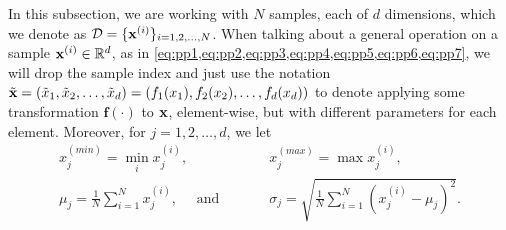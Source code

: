 \documentclass{statsmsc}
\begin{document}
{In this subsection, we are working with $N$ samples, each of $d$ dimensions, which we
denote as $\mathcal{D}=\{\mathbf{x}^{(i)} \}_{i=1,2,\dots,N}$. When talking about a general operation
on a sample $\mathbf{x}^{(i)}\in\mathbb{R}^d$, as in \cref{eq:pp1,eq:pp2,eq:pp3,eq:pp4,eq:pp5,eq:pp6,eq:pp7},
we will drop the sample index and just use the notation
$\tilde{\mathbf{x}}=\left(\tilde{x}_1,\tilde{x}_2,\dots,\tilde{x}_d \right)
=(f_1(x_1), f_2(x_2),\dots,f_d(x_d))$ to denote applying some transformation $\mathbf{f}(\cdot)$ to
$\mathbf{x}$, element-wise, but with different parameters for each element.
Moreover, for $j=1,2,\dots,d$, we let
\begin{align}
    x_j^{(min)}=\min_i x^{(i)}_j,  \qquad\qquad&\quad
    x_j^{(max)}=\max x^{(i)}_j, \nonumber\\
    \mu_j = \frac{1}{N} \sum^{N}_{i=1} x^{(i)}_j, \quad
    \textrm{ and }&\quad
    \sigma_j = \sqrt{\frac{1}{N} \sum^{N}_{i=1} \left( x^{(i)}_j - \mu_j\right)^2}.
\end{align}

}
\end{document}

